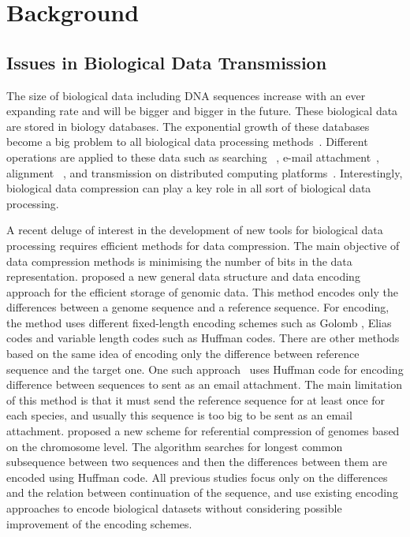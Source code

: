 \documentclass{singlecol-new}
\theoremstyle{TH}{
\newtheorem{lemma}{Lemma}
\newtheorem{theorem}[lemma]{Theorem}
\newtheorem{corrolary}[lemma]{Corrolary}
\newtheorem{conjecture}[lemma]{Conjecture}
\newtheorem{proposition}[lemma]{Proposition}
\newtheorem{claim}[lemma]{Claim}
\newtheorem{stheorem}[lemma]{Wrong Theorem}
}
\theoremstyle{THrm}{
\newtheorem{definition}{Definition}
\newtheorem{question}{Question}
\newtheorem{remark}{Remark}
\newtheorem{scheme}{Scheme}
}
\theoremstyle{THhit}{
\newtheorem{case}{Case}[section]
}
\begin{document}
\section{Background}
\label{sec2}
\subsection{Issues in Biological Data Transmission}
The size of biological data including DNA sequences increase with an ever expanding rate and will be bigger and bigger in the future. These biological data are stored in biology databases. The exponential growth of these databases become a big problem to all biological data processing methods~\citep{Doug08}.
Different operations are applied to these data such as searching ~\citep{val10}, e-mail attachment~\citep{chr09}, alignment ~\citep{che03}, and transmission on distributed computing platforms~\citep{cha14}. Interestingly, biological data compression can play a key role in all sort of biological data processing. 

A recent deluge of interest in the development of new tools for biological data processing requires efficient methods for data compression. The main objective of data compression methods is minimising the number of bits in the data representation. \citet{bra09} proposed a new general data structure and data encoding approach for the efficient storage of genomic data. This method encodes only the differences between a genome sequence and a reference sequence. For encoding, the method uses different fixed-length encoding schemes such as Golomb \citep{Golomb96}, Elias codes \citep{Elias75} and variable length codes such as Huffman codes. There are other methods based on the same idea of encoding only the difference between reference sequence and the target one. One such approach~\citep{chr09} uses Huffman code for encoding difference between sequences to sent as an email attachment. The main limitation of this method is that it must send the reference sequence for at least once for each species, and usually this sequence is too big to be sent as an email attachment.
\citet{wan11} proposed a new scheme for referential compression of genomes based on the chromosome level. The algorithm searches for longest common subsequence between two sequences and then the differences between them are encoded using Huffman code.
All previous studies focus only on the differences and the relation between continuation of the sequence, and use existing encoding approaches to encode biological datasets without considering possible improvement of the encoding schemes.
\end{document}
